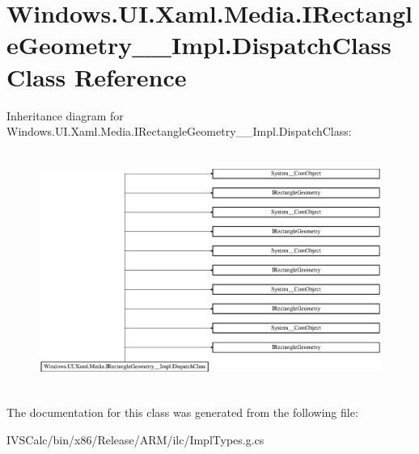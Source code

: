 \hypertarget{class_windows_1_1_u_i_1_1_xaml_1_1_media_1_1_i_rectangle_geometry_____impl_1_1_dispatch_class}{}\section{Windows.\+U\+I.\+Xaml.\+Media.\+I\+Rectangle\+Geometry\+\_\+\+\_\+\+Impl.\+Dispatch\+Class Class Reference}
\label{class_windows_1_1_u_i_1_1_xaml_1_1_media_1_1_i_rectangle_geometry_____impl_1_1_dispatch_class}
Inheritance diagram for Windows.\+U\+I.\+Xaml.\+Media.\+I\+Rectangle\+Geometry\+\_\+\+\_\+\+Impl.\+Dispatch\+Class\+:\begin{figure}[H]
\begin{center}
\leavevmode
\includegraphics[height=7.837150cm]{class_windows_1_1_u_i_1_1_xaml_1_1_media_1_1_i_rectangle_geometry_____impl_1_1_dispatch_class}
\end{center}
\end{figure}


The documentation for this class was generated from the following file\+:\begin{DoxyCompactItemize}
\item 
I\+V\+S\+Calc/bin/x86/\+Release/\+A\+R\+M/ilc/Impl\+Types.\+g.\+cs\end{DoxyCompactItemize}
